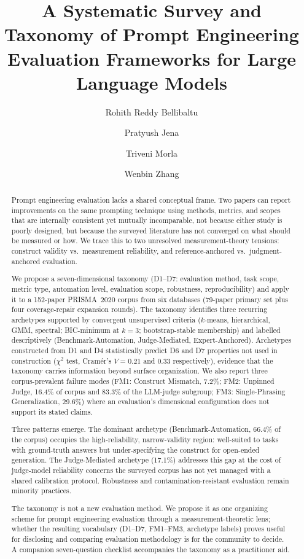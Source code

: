 \documentclass[acmsmall, nonacm, screen]{acmart}
\title{A Systematic Survey and Taxonomy of Prompt Engineering
Evaluation Frameworks for Large Language Models}
\author{Rohith Reddy Bellibaltu}
\affiliation{%
  \institution{Florida International University}
  \city{Miami}
  \state{Florida}
  \country{USA}
}
\author{Pratyush Jena}
\affiliation{%
  \institution{Florida International University}
  \city{Miami}
  \state{Florida}
  \country{USA}
}
\author{Triveni Morla}
\affiliation{%
  \institution{Florida International University}
  \city{Miami}
  \state{Florida}
  \country{USA}
}
\author{Wenbin Zhang}
\affiliation{%
  \institution{Florida International University}
  \city{Miami}
  \state{Florida}
  \country{USA}
}
\begin{document}

\begin{abstract}
Prompt engineering evaluation lacks a shared conceptual frame. Two
papers can report improvements on the same prompting technique using
methods, metrics, and scopes that are internally consistent yet
mutually incomparable, not because either study is poorly designed,
but because the surveyed literature has not converged on what should
be measured or how. We trace this to two unresolved measurement-theory
tensions: construct validity vs.\ measurement reliability, and
reference-anchored vs.\ judgment-anchored evaluation.

We propose a seven-dimensional taxonomy (D1--D7: evaluation method,
task scope, metric type, automation level, evaluation scope,
robustness, reproducibility) and apply it to a 152-paper PRISMA~2020
corpus from six databases (79-paper primary set plus four
coverage-repair expansion rounds). The taxonomy identifies three
recurring archetypes supported by convergent unsupervised criteria
($k$-means, hierarchical, GMM, spectral; BIC-minimum at $k=3$;
bootstrap-stable membership) and labelled descriptively
(Benchmark-Automation, Judge-Mediated, Expert-Anchored). Archetypes
constructed from D1 and D4 statistically predict D6 and D7
properties not used in construction ($\chi^2$ test, Cram\'{e}r's
$V = 0.21$ and $0.33$ respectively), evidence that the taxonomy
carries information beyond surface organization. We also report
three corpus-prevalent failure modes (FM1: Construct Mismatch, 7.2\%;
FM2: Unpinned Judge, 16.4\% of corpus and 83.3\% of the LLM-judge
subgroup; FM3: Single-Phrasing Generalization, 29.6\%) where an
evaluation's dimensional configuration does not support its stated
claims.

Three patterns emerge. The dominant archetype (Benchmark-Automation,
66.4\% of the corpus) occupies the high-reliability, narrow-validity
region: well-suited to tasks with ground-truth answers but
under-specifying the construct for open-ended generation. The
Judge-Mediated archetype (17.1\%) addresses this gap at the cost of
judge-model reliability concerns the surveyed corpus has not yet
managed with a shared calibration protocol. Robustness and
contamination-resistant evaluation remain minority practices.

The taxonomy is not a new evaluation method. We propose it as one
organizing scheme for prompt engineering evaluation through a
measurement-theoretic lens; whether the resulting vocabulary
(D1--D7, FM1--FM3, archetype labels) proves useful for disclosing
and comparing evaluation methodology is for the community to decide.
A companion seven-question checklist accompanies the taxonomy as a
practitioner aid.
\end{abstract}
\end{document}
